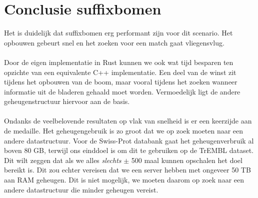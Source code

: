 \section{Conclusie suffixbomen}\label{sec:conclusie-suffix-bomen}
Het is duidelijk dat suffixbomen erg performant zijn voor dit scenario.
Het opbouwen gebeurt snel en het zoeken voor een match gaat vliegensvlug.
\\ \\
Door de eigen implementatie in Rust kunnen we ook wat tijd besparen ten opzichte van een equivalente C++ implementatie.
Een deel van de winst zit tijdens het opbouwen van de boom, maar vooral tijdens het zoeken wanneer informatie uit de bladeren gehaald moet worden.
Vermoedelijk ligt de andere geheugenstructuur hiervoor aan de basis.
\\ \\
Ondanks de veelbelovende resultaten op vlak van snelheid is er een keerzijde aan de medaille.
Het geheugengebruik is zo groot dat we op zoek moeten naar een andere datastructuur.
Voor de Swiss-Prot databank gaat het geheugenverbruik al boven 80 GB, terwijl ons einddoel is om dit te gebruiken op de TrEMBL dataset.
Dit wilt zeggen dat als we alles \textit{slechts} $\pm$ 500 maal kunnen opschalen het doel bereikt is.
Dit zou echter vereisen dat we een server hebben met ongeveer 50 TB aan RAM geheugen.
Dit is niet mogelijk, we moeten daarom op zoek naar een andere datastructuur die minder geheugen vereist.
